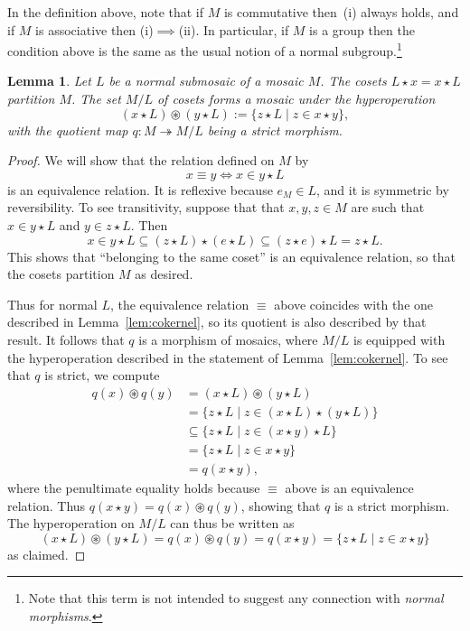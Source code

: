 \documentclass[reqno]{amsart}
\newcommand{\ostar}{\circledast}
\numberwithin{equation}{section}
\theoremstyle{plain}
\newtheorem{lemma}[equation]{Lemma}
\theoremstyle{definition}
\begin{document}
In the definition above, note that if $M$ is commutative then~(i) always holds, and if $M$ is associative then (i)$\implies$(ii). In particular, if $M$ is a group then the condition above is the same as the usual notion of a normal subgroup.\footnote{Note that this term is not intended to suggest any connection with \emph{normal morphisms}.}



\begin{lemma}\label{lem:normal quotient}
Let $L$ be a normal submosaic of a mosaic $M$. The cosets $L \star x = x \star L$ partition $M$.
The set $M/L$ of cosets forms a mosaic under the hyperoperation
\[
(x \star L) \ostar (y \star L) := \{z \star L \mid z \in x \star y\},
\]
with the quotient map $q \colon M \twoheadrightarrow M/L$ being a strict morphism.
\end{lemma}

\begin{proof}
We will show that the relation defined on $M$ by 
\[
x \equiv y \iff x \in y \star L
\]
is an equivalence relation. It is reflexive because $e_M \in L$, and it is symmetric by reversibility. To see transitivity, suppose that that $x,y,z \in M$ are such that $x \in y \star L$ and $y \in z \star L$. Then
\[
x \in y \star L \subseteq (z \star L) \star (e \star L) \subseteq (z \star e) \star L = z \star L.
\]
This shows that ``belonging to the same coset'' is an equivalence relation, so that the cosets partition $M$ as desired.

Thus for normal $L$, the equivalence relation $\equiv$ above coincides with the one described in Lemma~\ref{lem:cokernel}, so its quotient is also described by that result. It follows that $q$ is a morphism of mosaics, where $M/L$ is equipped with the hyperoperation described in the statement of Lemma~\ref{lem:cokernel}. To see that $q$ is strict, we compute
\begin{align*}
q(x) \ostar q(y) &= (x \star L) \ostar (y \star L) \\ &= \{z \star L \mid z \in (x \star L) \star (y \star L) \} \\
&\subseteq \{z \star L \mid z \in (x \star y) \star L \} \\
&=\{z \star L \mid z \in x \star y\}\\
&= q(x \star y),
\end{align*}
where the penultimate equality holds because $\equiv$ above is an equivalence relation. Thus $q(x \star y) = q(x) \ostar q(y)$, showing that $q$ is a strict morphism.
The hyperoperation on $M/L$ can thus be written as
\[
(x \star L) \ostar (y \star L) = q(x) \ostar q(y) = q(x \star y) = \{z \star L \mid z \in x \star y\}
\]
as claimed.
\end{proof}
\end{document}
